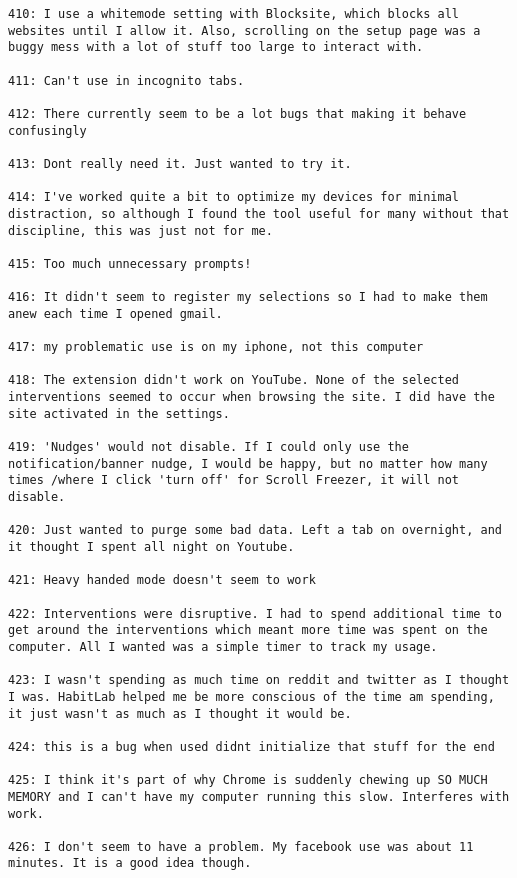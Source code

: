 \begin{lstlisting}[breaklines]
410: I use a whitemode setting with Blocksite, which blocks all websites until I allow it. Also, scrolling on the setup page was a buggy mess with a lot of stuff too large to interact with.

411: Can't use in incognito tabs.

412: There currently seem to be a lot bugs that making it behave confusingly

413: Dont really need it. Just wanted to try it.

414: I've worked quite a bit to optimize my devices for minimal distraction, so although I found the tool useful for many without that discipline, this was just not for me.

415: Too much unnecessary prompts!

416: It didn't seem to register my selections so I had to make them anew each time I opened gmail.

417: my problematic use is on my iphone, not this computer

418: The extension didn't work on YouTube. None of the selected interventions seemed to occur when browsing the site. I did have the site activated in the settings.

419: 'Nudges' would not disable. If I could only use the notification/banner nudge, I would be happy, but no matter how many times /where I click 'turn off' for Scroll Freezer, it will not disable.

420: Just wanted to purge some bad data. Left a tab on overnight, and it thought I spent all night on Youtube.

421: Heavy handed mode doesn't seem to work

422: Interventions were disruptive. I had to spend additional time to get around the interventions which meant more time was spent on the computer. All I wanted was a simple timer to track my usage.

423: I wasn't spending as much time on reddit and twitter as I thought I was. HabitLab helped me be more conscious of the time am spending, it just wasn't as much as I thought it would be.

424: this is a bug when used didnt initialize that stuff for the end

425: I think it's part of why Chrome is suddenly chewing up SO MUCH MEMORY and I can't have my computer running this slow. Interferes with work.

426: I don't seem to have a problem. My facebook use was about 11 minutes. It is a good idea though.


\end{lstlisting}
